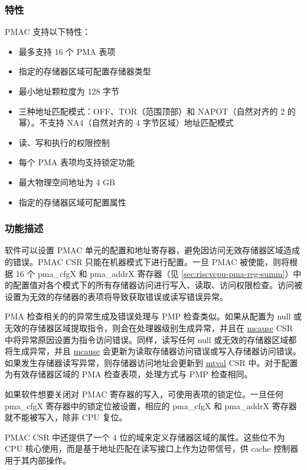 \documentclass[main\_\_CN.tex]{subfiles}
\begin{document}
\subsubsection{特性}
\label{sec:riscvcpu-pma-features}

PMAC 支持以下特性：

\begin{itemize}
    \item 最多支持 16 个 PMA 表项
    \item 指定的存储器区域可配置存储器类型
    \item 最小地址颗粒度为 128 字节
    \item 三种地址匹配模式：OFF、TOR（范围顶部）和 NAPOT（自然对齐的 2 的幂）。不支持 NA4（自然对齐的 4 字节区域）地址匹配模式
    \item 读、写和执行的权限控制
    \item 每个 PMA 表项均支持锁定功能
    \item 最大物理空间地址为 4 GB
    \item 指定的存储器区域可配置属性
\end{itemize}

\subsubsection{功能描述}
\label{sec:riscvcpu-pma-func-descr}

软件可以设置 PMAC 单元的配置和地址寄存器，避免因访问无效存储器区域造成的错误。PMAC CSR 只能在机器模式下进行配置。一旦 PMAC 被使能，则将根据 16 个 pma\_cfgX 和 pma\_addrX 寄存器（见 \ref{sec:riscvcpu-pma-reg-summ}）中的配置值对各个模式下的所有存储器访问进行写入、读取、访问权限检查。访问被设置为无效的存储器的表项将导致获取错误或读写错误异常。

PMA 检查相关的的异常生成及错误处理与 PMP 检查类似。如果从配置为 null 或无效的存储器区域提取指令，则会在处理器级别生成异常，并且在 \hyperref[regdesc:MCAUSE]{mcause} CSR 中将异常原因设置为指令访问错误。同样，读写任何 null 或无效的存储器区域都将生成异常，并且 \hyperref[regdesc:MCAUSE]{mcause} 会更新为读取存储器访问错误或写入存储器访问错误。如果发生存储器读写异常，则存储器访问地址会更新到 \hyperref[regdesc:MTVAL]{mtval} CSR 中。对于配置为有效存储器区域的 PMA 检查表项，处理方式与 PMP 检查相同。

如果软件想要关闭对 PMAC 寄存器的写入，可使用表项的锁定位。一旦任何 pma\_cfgX 寄存器中的锁定位被设置，相应的 pma\_cfgX 和 pma\_addrX 寄存器就不能被写入，除非 CPU 复位。

PMAC CSR 中还提供了一个 4 位的域来定义存储器区域的属性。这些位不为 CPU 核心使用，而是基于地址匹配在读写接口上作为边带信号，供 cache 控制器用于其内部操作。
\end{document}
